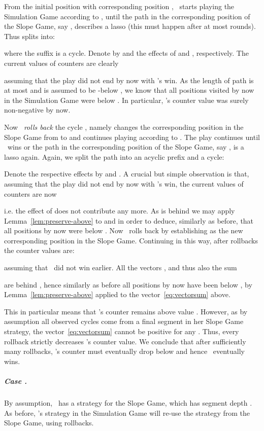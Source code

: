 From the initial position   with corresponding position ,
\R\ starts playing the Simulation Game according to ,
until the path in the corresponding position of the Slope Game, say ,
describes a lasso (this must happen after at most  rounds).
Thus  splits into:

where the suffix  is a  cycle. Denote by 
and  the effects of  and
, respectively. 
The current values of counters are clearly

assuming that the play did not end by now with \R's win.
As the length of path  is at most  and
 is assumed to be -below , we know that
all positions visited by now in the Simulation Game were below .
In particular, \R's counter value was surely non-negative by now.

Now \R\ \emph{rolls back} the cycle , namely changes the corresponding
position in the Slope Game from  to  
and continues playing according to . 
The play continues until \R\ wins or the path in the corresponding position of the
Slope Game, say , is a lasso again. Again, we split the path into an acyclic
prefix and a cycle:

Denote the respective effects by 
and .
A crucial but simple observation is that, assuming that the play did not end by now with \R's win,
the current values of counters are now

i.e. the effect  of  does not contribute any more.
As  is behind  we may
apply Lemma~\ref{lem:preserve-above} to  and 
in order to deduce, similarly as before, that all positions by now were below .
Now \R\ rolls back  by establishing  as
the new corresponding position in the Slope Game.
Continuing in this way, after  rollbacks the counter values are:

assuming that \R\ did not win earlier. 
All the vectors , and thus also the sum

are behind , hence similarly as before all positions by now have been below ,
by Lemma~\ref{lem:preserve-above} applied to the vector~\eqref{eq:vectorsum} above.

This in particular means that \R's counter remains above value .
However, as by assumption all observed cycles come from a final segment in her Slope Game strategy,
the vector~\eqref{eq:vectorsum} cannot be positive for any . Thus, every rollback strictly
decreases \V's counter value.
We conclude that after sufficiently many rollbacks, \V's counter must eventually drop below  and
hence \R\ eventually wins.
\subparagraph*{Case .} 
By assumption, \R\ has a strategy  for the Slope Game, which has segment depth .
As before, \R's strategy in the Simulation Game will re-use the strategy 
from the Slope Game, using rollbacks.

